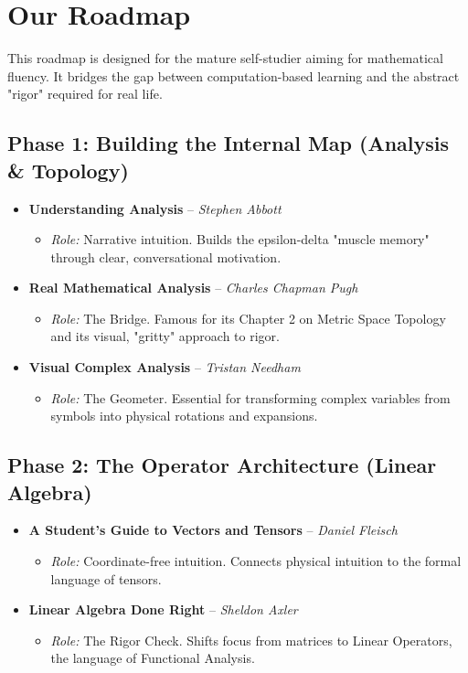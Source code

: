 \section{Our Roadmap}

This roadmap is designed for the mature self-studier aiming for mathematical fluency.
It bridges the gap between computation-based learning and the abstract "rigor" required for real life.


\subsection{Phase 1: Building the Internal Map (Analysis \& Topology)}
\begin{itemize}[leftmargin=1.5em]
    \item \textbf{Understanding Analysis} -- \textit{Stephen Abbott}
    \begin{itemize}
        \item \textit{Role:} Narrative intuition. Builds the epsilon-delta "muscle memory" through clear, conversational motivation.
    \end{itemize}
    \item \textbf{Real Mathematical Analysis} -- \textit{Charles Chapman Pugh}
    \begin{itemize}
        \item \textit{Role:} The Bridge. Famous for its Chapter 2 on Metric Space Topology and its visual, "gritty" approach to rigor.
    \end{itemize}
    \item \textbf{Visual Complex Analysis} -- \textit{Tristan Needham}
    \begin{itemize}
        \item \textit{Role:} The Geometer. Essential for transforming complex variables from symbols into physical rotations and expansions.
    \end{itemize}
\end{itemize}

\subsection{Phase 2: The Operator Architecture (Linear Algebra)}
\begin{itemize}[leftmargin=1.5em]
    \item \textbf{A Student's Guide to Vectors and Tensors} -- \textit{Daniel Fleisch}
    \begin{itemize}
        \item \textit{Role:} Coordinate-free intuition. Connects physical intuition to the formal language of tensors.
    \end{itemize}
    \item \textbf{Linear Algebra Done Right} -- \textit{Sheldon Axler}
    \begin{itemize}
        \item \textit{Role:} The Rigor Check. Shifts focus from matrices to Linear Operators, the language of Functional Analysis.
    \end{itemize}
\end{itemize}

